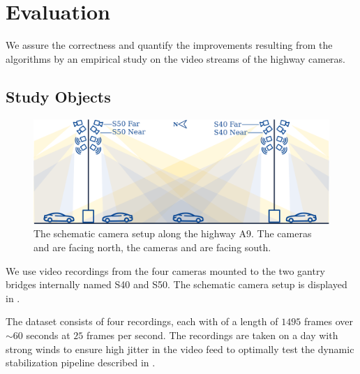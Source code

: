 
\section{Evaluation}

We assure the correctness and quantify the improvements resulting from the algorithms by an empirical study on the video streams of the highway cameras.

\subsection{Study Objects}
\begin{figure}[t]
    \begin{center}
       \includegraphics[width=\linewidth]{images/cameras_schema.png}
    \end{center}
       \caption{The schematic camera setup along the highway A9.
       The cameras  and  are facing north,
       the cameras  and  are facing south.}
    \label{fig:cameras_schema}
    \end{figure}

We use video recordings from the four cameras mounted to the two gantry bridges internally named S40 and S50. The schematic camera setup is displayed in .

The dataset consists of four recordings, each with of a length of $1495$ frames over $\sim 60$ seconds at $25$ frames per second.
The recordings are taken on a day with strong winds to ensure high jitter in the video feed to optimally test the dynamic stabilization pipeline described in . 


